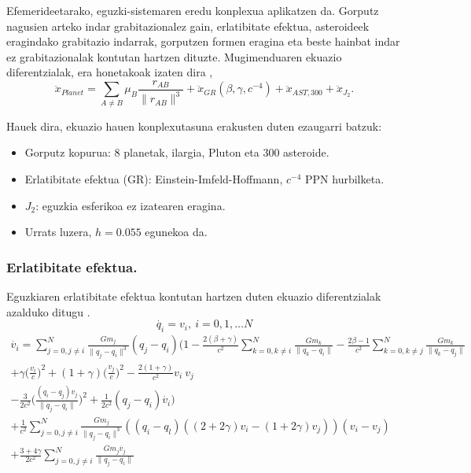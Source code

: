 Efemerideetarako, eguzki-sistemaren eredu konplexua aplikatzen da. Gorputz nagusien arteko indar grabitazionalez gain, erlatibitate efektua, asteroideek eragindako grabitazio indarrak, gorputzen formen eragina eta beste hainbat indar ez grabitazionalak kontutan hartzen dituzte. Mugimenduaren ekuazio diferentzialak, era honetakoak izaten dira \cite{Feinga2015},      
      \begin{equation*}
      \ddot{x}_{Planet}= \sum_{A \neq B} \mu_B \frac{r_{AB}}{\|r_{AB}\|^3}+\ddot{x}_{GR} (\beta,\gamma,c^{-4})+ \ddot{x}_{AST,300}+ \ddot{x}_{J_2}.
      \end{equation*}

Hauek dira, ekuazio hauen konplexutasuna erakusten duten ezaugarri batzuk:      
      \begin{itemize}
      \item Gorputz kopurua: $8$ planetak, ilargia, Pluton eta 300 asteroide.
      \item Erlatibitate efektua (GR): Einstein-Imfeld-Hoffmann, $c^{-4}$ PPN hurbilketa.
      \item $J_2$: eguzkia esferikoa ez izatearen eragina. 
      \item Urrats luzera, $h=0.055$ egunekoa da.
      \end{itemize}   

\subsubsection*{Erlatibitate efektua.}
Eguzkiaren erlatibitate efektua kontutan hartzen duten ekuazio diferentzialak azalduko ditugu \cite{Kopeikin2011}.
\begin{equation}
\dot{q_i}=v_i, \  i=0,1,\dots N
\end{equation}
\begin{multline} 
\dot{v_i}= \sum_{j=0,j \neq i}^{N} \frac{Gm_j}{\|q_j-q_i\|^3} (q_j-q_i)
           \bigg(1- \frac{2(\beta+\gamma)}{c^2} \sum\limits_{k=0, k \neq i}^{N} \frac{Gm_k}{\|q_k-q_i\|} 
                  - \frac{2\beta-1}{c^2}        \sum\limits_{k=0, k \neq j}^{N} \frac{Gm_k}{\|q_k-q_j\|} \\
                  + \gamma \big(\frac{v_i}{c}\big)^2 + (1+\gamma) \big(\frac{v_j}{c} \big)^2 
                  - \frac{2(1+\gamma)}{c^2} v_i \ v_j \\
                  - \frac{3}{2c^2} \big(\frac{(q_i-q_j) v_j}{\|q_j-q_i\|} \big)^2+                  
                  \frac{1}{2c^2}(q_j-q_i) \dot{v_i} \bigg) \\
           + \frac{1}{c^2} \sum_{j=0,j \neq i}^{N} \frac{Gm_j}{\|q_j-q_i\|^3} 
             ((q_i-q_l) ((2+2\gamma)v_i-(1+2\gamma)v_j)) (v_i-v_j) \\
           + \frac{3+4\gamma}{2c^2} \sum_{j=0,j \neq i}^{N} \frac{Gm_j \dot{v_j}}{\|q_j-q_i\|}                                      
\end{multline}

